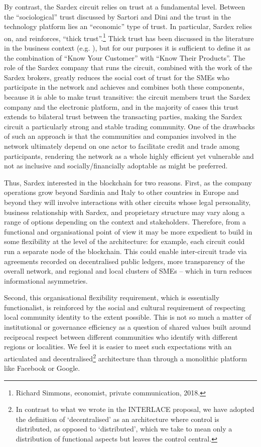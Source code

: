 By contrast, the Sardex circuit relies on trust at a fundamental level. Between the ``sociological'' trust discussed by Sartori and Dini \cite{SartoriDini2016} and the trust in the technology platform lies an ``economic'' type of trust. In particular, Sardex relies on, and reinforces, ``thick trust''.\footnote{Richard Simmons, economist, private communication, 2018.} Thick trust has been discussed in the literature in the business context (e.g. \cite{VosselmanMeerKooistra2009}), but for our purposes it is sufficient to define it as the combination of ``Know Your Customer'' with ``Know Their Products''. The role of the Sardex company that runs the circuit, combined with the work of the Sardex brokers, greatly reduces the social cost of trust for the SMEs who participate in the network and achieves and combines both these components, because it is able to make trust transitive: the circuit members trust the Sardex company and the electronic platform, and in the majority of cases this trust extends to bilateral trust between the transacting parties, making the Sardex circuit a particularly strong and stable trading community. One of the drawbacks of such an approach is that the communities and companies involved in the network ultimately depend on one actor to facilitate credit and trade among participants, rendering the network as a whole highly efficient yet vulnerable and not as inclusive and socially/financially adoptable as might be preferred.

Thus, Sardex interested in the blockchain for two reasons. First, as the company operations grow beyond Sardinia and Italy to other countries in Europe and beyond they will involve interactions with other circuits whose legal personality, business relationship with Sardex, and proprietary structure may vary along a range of options depending on the context and stakeholders. Therefore, from a functional and organisational point of view it may be more expedient to build in some flexibility at the level of the architecture: for example, each circuit could run a separate node of the blockchain. This could enable inter-circuit trade via agreements recorded on decentralised public ledgers, more transparency of the overall network, and regional and local clusters of SMEs -- which in turn reduces informational asymmetries.

Second, this organisational flexibility requirement, which is essentially functionalist, is reinforced by the social and cultural requirement of respecting local community identity to the extent possible. This is not so much a matter of institutional or governance efficiency as a question of shared values built around reciprocal respect between different communities who identify with different regions or localities. We feel it is easier to meet such expectations with an articulated and decentralised\footnote{In contrast to what we wrote in the INTERLACE proposal, we have adopted the definition of `decentralised' as an architecture where control is distributed, as opposed to `distributed', which we take to mean only a distribution of functional aspects but leaves the control central.} architecture than through a monolithic platform like Facebook or Google.


